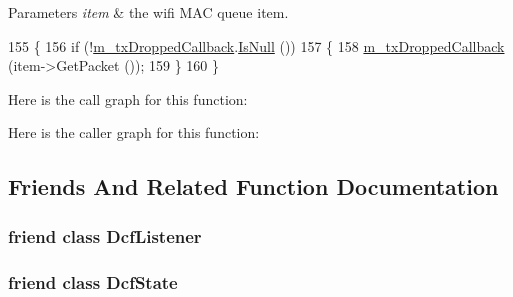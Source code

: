 \begin{DoxyParams}{Parameters}
{\em item} & the wifi M\+AC queue item. \\
\hline
\end{DoxyParams}

\begin{DoxyCode}
155 \{
156   \textcolor{keywordflow}{if} (!\hyperlink{classns3_1_1DcaTxop_afcbfde214243789777b66de41ccf0088}{m\_txDroppedCallback}.\hyperlink{classns3_1_1Callback_aa8e27826badbf37f84763f36f70d9b54}{IsNull} ())
157     \{
158       \hyperlink{classns3_1_1DcaTxop_afcbfde214243789777b66de41ccf0088}{m\_txDroppedCallback} (item->GetPacket ());
159     \}
160 \}
\end{DoxyCode}


Here is the call graph for this function\+:




Here is the caller graph for this function\+:




\subsection{Friends And Related Function Documentation}
\subsubsection[{\texorpdfstring{Dcf\+Listener}{DcfListener}}]{\setlength{\rightskip}{0pt plus 5cm}friend class Dcf\+Listener\hspace{0.3cm}{\ttfamily [friend]}}\hypertarget{classns3_1_1DcaTxop_a0dbe0f6675c16b2568ac5560de5b993a}{}\label{classns3_1_1DcaTxop_a0dbe0f6675c16b2568ac5560de5b993a}
\subsubsection[{\texorpdfstring{Dcf\+State}{DcfState}}]{\setlength{\rightskip}{0pt plus 5cm}friend class {\bf Dcf\+State}\hspace{0.3cm}{\ttfamily [friend]}}\hypertarget{classns3_1_1DcaTxop_a709d6e7063c67126c6931ecc0c9a3617}{}\label{classns3_1_1DcaTxop_a709d6e7063c67126c6931ecc0c9a3617}
